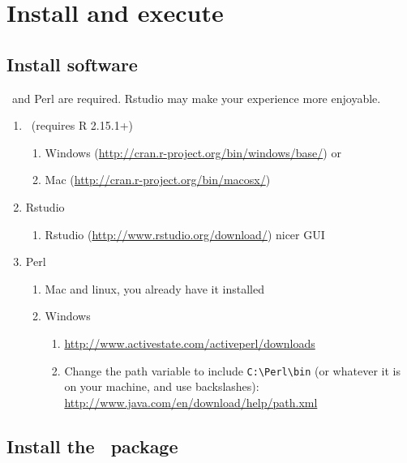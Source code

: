 \renewcommand{\ADAfilename}{tdl_inst} %
\chapter{Install and execute}
\label{ch:tdllicor_install_execute}



\section{Install software}

\R\ and Perl are required.  Rstudio may make your experience more enjoyable.
\begin{enumerate}
\item \R\ (requires R 2.15.1+)
  \begin{enumerate}
  \item Windows (\url{http://cran.r-project.org/bin/windows/base/}) or
  \item Mac (\url{http://cran.r-project.org/bin/macosx/})
  \end{enumerate}
\item Rstudio
  \begin{enumerate}
  \item Rstudio (\url{http://www.rstudio.org/download/}) nicer GUI
  \end{enumerate}
\item Perl
  \begin{enumerate}
  \item Mac and linux, you already have it installed
  \item Windows
    \begin{enumerate}
    \item \url{http://www.activestate.com/activeperl/downloads}
    \item Change the path variable to include \verb|C:\Perl\bin| (or whatever it is on your machine, and use backslashes): \url{http://www.java.com/en/download/help/path.xml}
    \end{enumerate}
  \end{enumerate}
\end{enumerate}


\section{Install the \tdllicor\ package}

